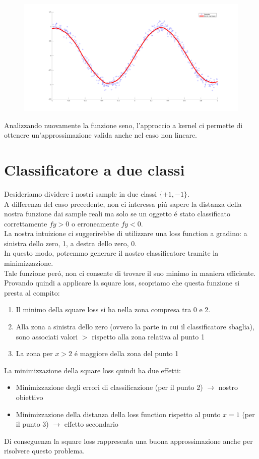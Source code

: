 \documentclass[12pt]{article}
\begin{document}
\begin{figure}[H]
  \centering
  \includegraphics[width=\textwidth]{images/KernelRegressionSine}
\end{figure}
Analizzando nuovamente la funzione seno, l'approccio a kernel ci permette di
ottenere un'approssimazione valida anche nel caso non lineare.

\newpage
\section{Classificatore a due classi}

Desideriamo dividere i nostri sample in due classi $\{+1,-1\}$. \\
A differenza del caso precedente, non ci interessa piú sapere la distanza
della nostra funzione dai sample reali ma solo se un oggetto é stato classificato
correttamente $fy>0$ o erroneamente $fy<0$. \\
La nostra intuizione ci suggerirebbe di utilizzare una loss function a gradino:
a sinistra dello zero, 1, a destra dello zero, 0. \\
In questo modo, potremmo generare il nostro classificatore tramite la minimizzazione. \\
Tale funzione peró, non ci consente di trovare il suo minimo in maniera efficiente. \\
Provando quindi a applicare la square loss, scopriamo che questa funzione si presta al compito:
\begin{enumerate}
  \item Il minimo della square loss si ha nella zona compresa tra 0 e 2.
  \item Alla zona a sinistra dello zero (ovvero la parte in cui il classificatore sbaglia), sono associati valori $>$ rispetto alla zona relativa al punto 1
  \item La zona per $x > 2$ é maggiore della zona del punto 1
\end{enumerate}
La minimizzazione della square loss quindi ha due effetti:
\begin{itemize}
  \item Minimizzazione degli errori di classificazione (per il punto 2) $\rightarrow$ nostro obiettivo
  \item Minimizzazione della distanza della loss function rispetto al punto $x=1$ (per il punto 3) $\rightarrow$ effetto secondario
\end{itemize}
Di conseguenza la square loss rappresenta una buona approssimazione anche per risolvere questo problema.
\end{document}
